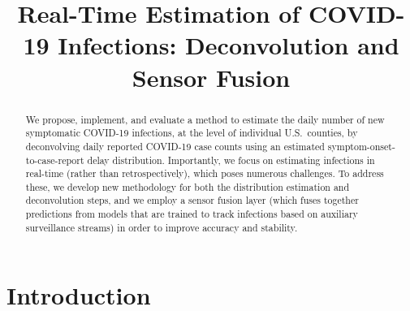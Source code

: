 \documentclass[sts]{imsart}
\theoremstyle{plain}
\theoremstyle{definition}
\theoremstyle{remark}
\begin{document}
\begin{frontmatter}
\title{Real-Time Estimation of COVID-19 Infections: Deconvolution and Sensor
  Fusion}  


\begin{abstract}
We propose, implement, and evaluate a method to estimate the daily number of new
symptomatic COVID-19 infections, at the level of individual U.S.\ counties, by
deconvolving daily reported COVID-19 case counts using an estimated
symptom-onset-to-case-report delay distribution. Importantly, we focus on
estimating infections in real-time (rather than retrospectively), which poses
numerous challenges. To address these, we develop new methodology for both the 
distribution estimation and deconvolution steps, and we employ a sensor fusion 
layer (which fuses together predictions from models that are trained to track
infections based on auxiliary surveillance streams) in order to improve accuracy
and stability. 
\end{abstract}

\begin{keyword}
\end{keyword}

\end{frontmatter}

\section{Introduction}
\label{sec:intro}
\end{document}
